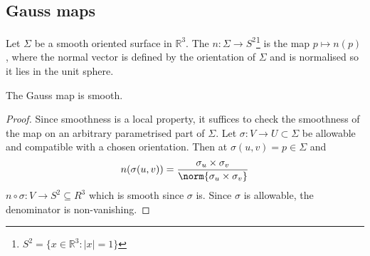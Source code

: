 \subsection{Gauss maps}
\begin{definition}
	Let $\Sigma$ be a smooth oriented surface in $\mathbb R^3$.
	The  $n \colon \Sigma \to S^2$\footnote{$S^2 = \{x \in \mathbb{R}^3 : |x| = 1\}$} is the map $p \mapsto n(p)$, where the normal vector is defined by the orientation of $\Sigma$ and is normalised so it lies in the unit sphere.
\end{definition}

\begin{lemma}
	The Gauss map is smooth.
\end{lemma}

\begin{proof}
	Since smoothness is a local property, it suffices to check the smoothness of the map on an arbitrary parametrised part of $\Sigma$.
	Let $\sigma \colon V \to U \subset \Sigma$ be allowable and compatible with a chosen orientation.
	Then at $\sigma(u, v) = p \in \Sigma$ and
	\begin{align*}
		n(\sigma(u, v)) = \frac{\sigma_u \times \sigma_v}{\norm{\sigma_u \times \sigma_v}}
	\end{align*}
	$n \circ \sigma : V \to S^2 \subseteq R^3$ which is smooth since $\sigma$ is.
	Since $\sigma$ is allowable, the denominator is non-vanishing.
\end{proof}

